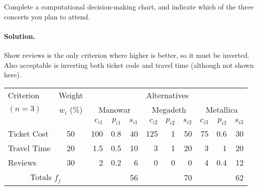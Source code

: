 Complete a computational decision-making chart, and indicate which of the three concerts you plan to attend.


\paragraph{Solution.}
Show reviews is the only criterion where higher is better, so it must be inverted. Also acceptable is inverting both ticket code and travel time (although not shown here).

{\Large
\begin{center}
\begin{tabular}{l|c|r|r|r|r|r|r|r|r|r|}
Criterion & Weight & \multicolumn{9}{c}{Alternatives} \\
$(n=3)$ & $w_i$ (\%) & \multicolumn{3}{c|}{Manowar} & \multicolumn{3}{c|}{Megadeth} & \multicolumn{3}{c}{Metallica} \\
&& $c_{i1}$ & $p_{i1}$& $s_{i1}$ & $c_{i2}$ & $p_{i2}$ & $s_{i2}$ & $c_{i3}$ & $p_{i3}$ & $s_{i3}$ \\  \hline
Ticket Cost & 50 & 100 & 0.8 & 40 & 125 & 1 & 50 & 75 & 0.6 & 30 \\
Travel Time & 20 & 1.5 & 0.5 & 10 & 3   & 1 & 20 & 3  & 1   & 20 \\
Reviews     & 30 & 2 & 0.2 & 6    & 0   & 0 & 0  & 4  & 0.4 & 12\\ 
\hline
\multicolumn{2}{c|}{Totals $f_j$} & \multicolumn{3}{r}{56} & \multicolumn{3}{r}{70} & \multicolumn{3}{r}{62}
\end{tabular}
\end{center}
}





